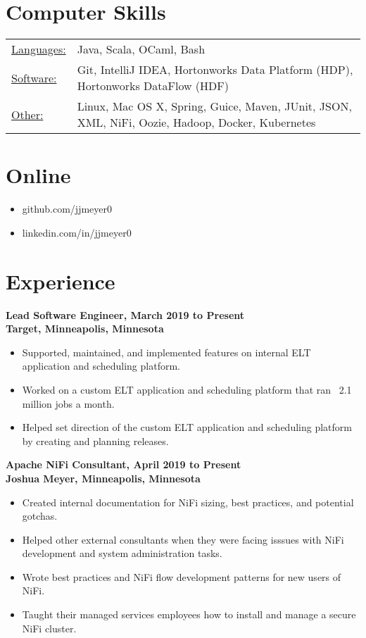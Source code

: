 \documentclass[margin]{res}
\begin{document}

\address{{\bf Contact Information}\\jjmeyer0@gmail.com}
\address{{\bf } \\}

\begin{resume} 

\section{Computer Skills}
\begin{tabular}{l p{4in}}
  \underline{Languages:} & Java, Scala, OCaml, Bash\\
  \underline{Software:} & Git, IntelliJ IDEA, Hortonworks Data Platform (HDP), Hortonworks DataFlow (HDF) \\
  \underline{Other:} & Linux, Mac OS X, Spring, Guice, Maven, JUnit, JSON, XML, NiFi, Oozie, Hadoop, Docker, Kubernetes
\end{tabular}

\section{Online}
\begin{itemize} \itemsep -2pt
\item github.com/jjmeyer0
\item linkedin.com/in/jjmeyer0
\end{itemize}

\section{Experience}
 {\bf Lead Software Engineer, March 2019 to Present\\
 Target, Minneapolis, Minnesota}
 \begin{itemize} \itemsep -2pt
 \item Supported, maintained, and implemented features on internal ELT application and scheduling platform.
 \item Worked on a custom ELT application and scheduling platform that ran ~2.1 million jobs a month.
 \item Helped set direction of the custom ELT application and scheduling platform by creating and planning releases.
 \end{itemize}
 
 {\bf Apache NiFi Consultant, April 2019 to Present\\
 Joshua Meyer, Minneapolis, Minnesota}
 \begin{itemize} \itemsep -2pt
 \item Created internal documentation for NiFi sizing, best practices, and potential gotchas.
 \item Helped other external consultants when they were facing isssues with NiFi development and system administration tasks.
 \item Wrote best practices and NiFi flow development patterns for new users of NiFi.
 \item Taught their managed services employees how to install and manage a secure NiFi cluster.
 \end{itemize}


\end{resume}
\end{document}
